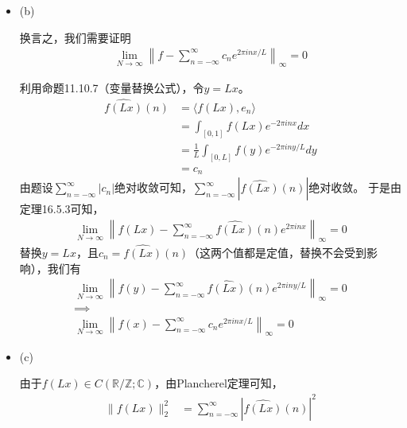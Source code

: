 \documentclass{article}
\begin{document}
\begin{itemize}
  \item (b)

        换言之，我们需要证明
        \begin{align*}
          \lim\limits_{N \to \infty}\left\| f - \sum \limits_{n = -\infty}^\infty c_n e^{2\pi i nx / L}\right\|_\infty = 0
        \end{align*}

        利用命题11.10.7（变量替换公式），令$y = Lx$。
        \begin{align*}
          \widehat{f(Lx)}(n)
           & = \langle f(Lx), e_n \rangle                        \\
           & = \int_{[0, 1]} f(Lx) e^{-2\pi i nx} dx             \\
           & = \frac{1}{L}\int_{[0, L]} f(y) e^{-2\pi i ny/L} dy \\
           & = c_n
        \end{align*}
        由题设$\sum\limits_{n = -\infty}^\infty |c_n|$绝对收敛可知，$\sum\limits_{n = -\infty}^\infty |\widehat{f(Lx)}(n)|$绝对收敛。
        于是由定理16.5.3可知，
        \begin{align*}
          \lim\limits_{N \to \infty}\left\| f(Lx) - \sum \limits_{n = -\infty}^\infty  \widehat{f(Lx)}(n)e^{2\pi i nx}\right\|_\infty = 0
        \end{align*}
        替换$y = Lx$，且$c_n = \widehat{f(Lx)}(n)$（这两个值都是定值，替换不会受到影响），我们有
        \begin{align*}
          \lim\limits_{N \to \infty}\left\| f(y) - \sum \limits_{n = -\infty}^\infty  \widehat{f(Lx)}(n)e^{2\pi i ny/L}\right\|_\infty = 0 \\
          \implies                                                                                                                         \\
          \lim\limits_{N \to \infty}\left\| f(x) - \sum \limits_{n = -\infty}^\infty  c_ne^{2\pi i nx / L}\right\|_\infty = 0
        \end{align*}

  \item (c)

        由于$f(Lx) \in C(\mathbb{R}/\mathbb{Z}; \mathbb{C})$，由Plancherel定理可知，
        \begin{align*}
          \|f(Lx)\|_2^2 & = \sum\limits_{n = -\infty}^\infty |\widehat{f(Lx)}(n)|^2 \\
        \end{align*}


\end{itemize}
\end{document}
